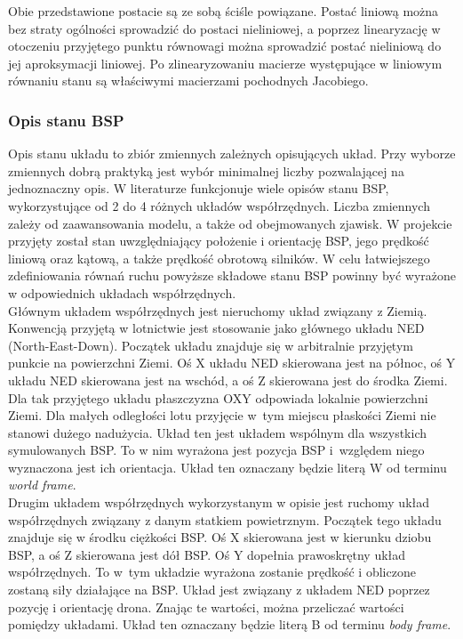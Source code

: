 Obie przedstawione postacie są ze sobą ściśle powiązane. Postać liniową można bez straty ogólności sprowadzić do postaci nieliniowej, a poprzez linearyzację w otoczeniu przyjętego punktu równowagi można sprowadzić postać nieliniową do jej aproksymacji liniowej. Po zlinearyzowaniu macierze występujące w liniowym równaniu stanu są właściwymi macierzami pochodnych Jacobiego.

\subsubsection{Opis stanu BSP}

Opis stanu układu to zbiór zmiennych zależnych opisujących układ. Przy wyborze zmiennych dobrą praktyką jest wybór minimalnej liczby pozwalającej na jednoznaczny opis. W literaturze funkcjonuje wiele opisów stanu BSP, wykorzystujące od 2 do 4 różnych układów współrzędnych. Liczba zmiennych zależy od zaawansowania modelu, a także od obejmowanych zjawisk. W projekcie przyjęty został stan uwzględniający położenie i orientację BSP, jego prędkość liniową oraz kątową, a także prędkość obrotową silników. W celu łatwiejszego zdefiniowania równań ruchu powyższe składowe stanu BSP powinny być wyrażone w odpowiednich układach współrzędnych.\\

Głównym układem współrzędnych jest nieruchomy układ związany z Ziemią. Konwencją przyjętą w lotnictwie jest stosowanie jako głównego układu NED (North-East-Down). Początek układu znajduje się w arbitralnie przyjętym punkcie na powierzchni Ziemi. Oś X układu NED skierowana jest na północ, oś Y układu NED skierowana jest na wschód, a oś Z skierowana jest do środka Ziemi. Dla tak przyjętego układu płaszczyzna OXY odpowiada lokalnie powierzchni Ziemi. Dla małych odległości lotu przyjęcie w~tym miejscu płaskości Ziemi nie stanowi dużego nadużycia. Układ ten jest układem wspólnym dla wszystkich symulowanych BSP. To w nim wyrażona jest pozycja BSP i~względem niego wyznaczona jest ich orientacja. Układ ten oznaczany będzie literą W od terminu \textit{world frame}.\\

Drugim układem współrzędnych wykorzystanym w opisie jest ruchomy układ współrzędnych związany z danym statkiem powietrznym. Początek tego układu znajduje się w środku ciężkości BSP. Oś X skierowana jest w kierunku dziobu BSP, a oś Z skierowana jest dół BSP. Oś Y dopełnia prawoskrętny układ współrzędnych. To w~tym układzie wyrażona zostanie prędkość i obliczone zostaną siły działające na BSP. Układ jest związany z układem NED poprzez pozycję i orientację drona. Znając te wartości, można przeliczać wartości pomiędzy układami.  Układ ten oznaczany będzie literą B od terminu \textit{body frame}.

